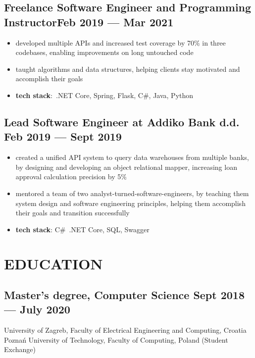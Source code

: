 \documentclass{article}
\begin{document}
\subsection{Freelance Software Engineer and Programming Instructor\hfill Feb 2019 --- Mar 2021}
\begin{itemize}
  \itemsep0em
  \item developed multiple APIs and increased test coverage by 70\% in three codebases, enabling improvements on long untouched code
  \item taught algorithms and data structures, helping clients stay motivated and accomplish their goals
  \item {\bfseries tech stack}:~.NET Core, Spring, Flask, C\#, Java, Python
\end{itemize}

\subsection{Lead Software Engineer at Addiko Bank d.d. \hfill Feb 2019 --- Sept 2019}
\begin{itemize}
  \itemsep0em
  \item created a unified API system to query data warehouses from multiple banks, by designing and developing an object relational mapper, increasing loan approval calculation precision by 5\%
  \item mentored a team of two analyst-turned-software-engineers, by teaching them system design and software engineering principles, helping them accomplish their goals and transition successfully
  \item {\bfseries tech stack}: C\#~.NET Core, SQL, Swagger
\end{itemize}

\section{EDUCATION}
\subsection{Master's degree, Computer Science \hfill Sept 2018 --- July 2020}
University of Zagreb, Faculty of Electrical Engineering and Computing, Croatia\\
Poznań University of Technology, Faculty of Computing, Poland (Student Exchange)
\end{document}
